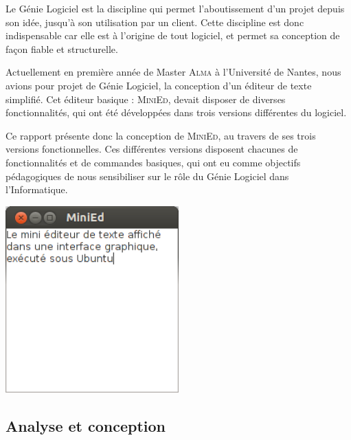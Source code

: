 \documentclass[a4paper]{article}
\begin{document}
	\vspace{0.5cm}

	Le Génie Logiciel est la discipline qui permet l’aboutissement d’un projet depuis son idée, jusqu’à son utilisation par un client. Cette discipline est donc indispensable car elle est à l’origine de tout logiciel, et permet sa conception de façon fiable et structurelle.

	\vspace{0.5cm}

	Actuellement en première année de Master \textsc{Alma} à l’Université de Nantes, nous avions pour projet de Génie Logiciel, la conception d’un éditeur de texte simplifié. Cet éditeur basique : \textsc{MiniEd}, devait disposer de diverses fonctionnalités, qui ont été développées dans trois versions différentes du logiciel.  

	\vspace{0.5cm}

	Ce rapport présente donc la conception de \textsc{MiniEd}, au travers de ses trois versions fonctionnelles. Ces différentes versions disposent chacunes de fonctionnalités et de commandes basiques, qui ont eu comme objectifs pédagogiques de nous sensibiliser sur le rôle du Génie Logiciel dans l'Informatique.

	\vspace{2.5cm}

	\begin{center}
		\includegraphics[width=0.5\textwidth]{MiniEd_capture.png}~
	\end{center}

	\newpage



	\begin{center}
		\section{Analyse et conception}
	\end{center}
\end{document}
